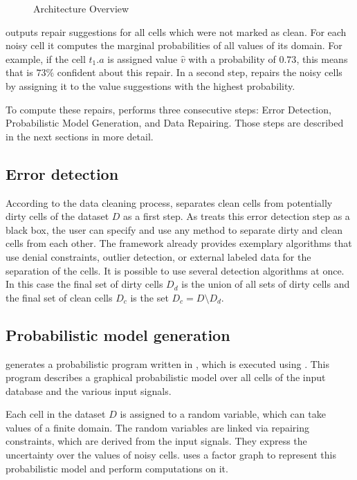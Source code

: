   \begin{figure}
    \centering
    
    \caption{\holoclean{} Architecture Overview}
    \label{fig:architecture}
  \end{figure}

  \holoclean{} outputs repair suggestions for all cells which were not marked as clean.
  For each noisy cell it computes the marginal probabilities of all values of its domain.
  For example, if the cell $t_1.a$ is assigned value $\hat{v}$ with a probability of $0.73$, this means that \holoclean{} is $73\%$ confident about this repair.
  In a second step, \holoclean{} repairs the noisy cells by assigning it to the value suggestions with the highest probability.
  
  To compute these repairs, \holoclean{} performs three consecutive steps: \textsf{Error Detection}, \textsf{Probabilistic Model Generation}, and \textsf{Data Repairing}.
  Those steps are described in the next sections in more detail.
 
  \subsection{Error detection}\label{sec:error_detection}
  According to the data cleaning process, \holoclean{} separates clean cells from potentially dirty cells of the dataset $D$ as a first step.
  As \holoclean{} treats this error detection step as a black box, the user can specify and use any method to separate dirty and clean cells from each other.
  The framework already provides exemplary algorithms that use denial constraints, outlier detection, or external labeled data for the separation of the cells.
  It is possible to use several detection algorithms at once.
  In this case the final set of dirty cells $D_d$ is the union of all sets of dirty cells and the final set of clean cells $D_c$ is the set $D_c = D \setminus D_d$.

  \subsection{Probabilistic model generation}\label{sec:model_generation}
  \holoclean{} generates a probabilistic program written in \ddlog{}, which is executed using \deepdive{}.
  This program describes a graphical probabilistic model over all cells of the input database and the various input signals.
  
  Each cell in the dataset $D$ is assigned to a random variable, which can take values of a finite domain.
  The random variables are linked via repairing constraints, which are derived from the input signals.
  They express the uncertainty over the values of noisy cells.
  \holoclean{} uses a factor graph to represent this probabilistic model and perform computations on it.
  

